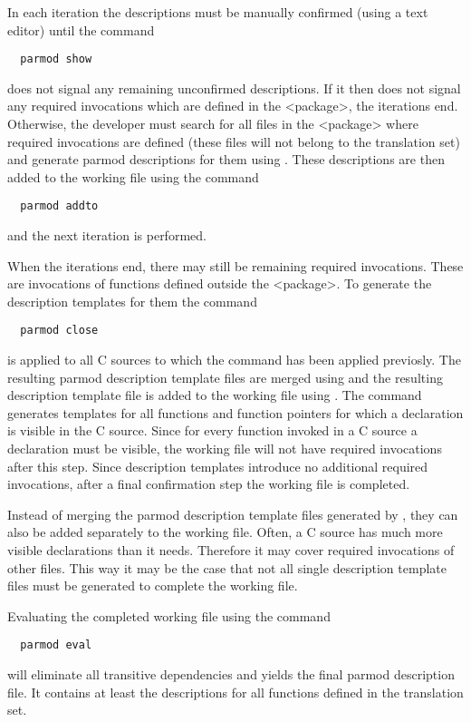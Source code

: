 In each iteration the descriptions must be manually confirmed (using a text editor) until the command
\begin{verbatim}
  parmod show
\end{verbatim}
does not signal any remaining unconfirmed descriptions. If it then does not signal any required 
invocations which are defined in the <package>, the iterations end. Otherwise, the developer must
search for all files in the <package> where required invocations are defined (these files will
not belong to the translation set) and generate parmod descriptions for them using .
These descriptions are then added to the working file using the command
\begin{verbatim}
  parmod addto
\end{verbatim}
and the next iteration is performed.

When the iterations end, there may still be remaining required invocations. These are invocations of 
functions defined outside the <package>. To generate the description templates for them the command
\begin{verbatim}
  parmod close
\end{verbatim}
is applied to all C sources to which the command  has been applied previosly. The resulting 
parmod description template files are merged using  and the resulting description template file
is added to the working file using . The command  generates templates for
all functions and function pointers for which a declaration is visible in the C source. Since for every function
invoked in a C source a declaration must be visible, the working file will not have required invocations after
this step. Since description templates introduce no additional required invocations, after a final confirmation
step the working file is completed.

Instead of merging the parmod description template files generated by , they can also be added
separately to the working file. Often, a C source has much more visible declarations than it needs. Therefore it may
cover required invocations of other files. This way it may be the case that not all single description template
files must be generated to complete the working file.

Evaluating the completed working file using the command
\begin{verbatim}
  parmod eval
\end{verbatim}
will eliminate all transitive dependencies and yields the final parmod description file. It contains at least 
the descriptions for all functions defined in the translation set.


